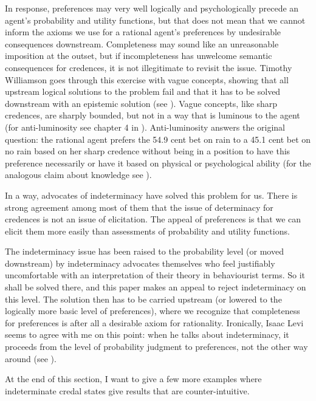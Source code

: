 In response, preferences may very well logically and
psychologically precede an agent's probability and
utility functions, but that does not mean that we
cannot inform the axioms we use for a rational agent's
preferences by undesirable consequences downstream.
Completeness may sound like an unreasonable imposition
at the outset, but if incompleteness has unwelcome
semantic consequences for credences, it is not
illegitimate to revisit the issue. Timothy Williamson
goes through this exercise with vague concepts, showing
that all upstream logical solutions to the problem fail
and that it has to be solved downstream with an
epistemic solution (see ).
Vague concepts, like sharp credences, are sharply
bounded, but not in a way that is luminous to the agent
(for anti-luminosity see chapter 4 in
). Anti-luminosity answers the
original question: the rational agent prefers the 54.9
cent bet on rain to a 45.1 cent bet on no rain based on
her sharp credence without being in a position to have
this preference necessarily or have it based on
physical or psychological ability (for the analogous
claim about knowledge see ).

In a way, advocates of indeterminacy have solved this
problem for us. There is strong agreement among most of
them that the issue of determinacy for credences is not
an issue of elicitation. The appeal of preferences is
that we can elicit them more easily than assessments of
probability and utility functions.

The indeterminacy issue has been raised to the
probability level (or moved downstream) by
indeterminacy advocates themselves who feel justifiably
uncomfortable with an interpretation of their theory in
behaviourist terms. So it shall be solved there, and
this paper makes an appeal to reject indeterminacy on
this level. The solution then has to be carried
upstream (or lowered to the logically more basic level
of preferences), where we recognize that completeness
for preferences is after all a desirable axiom for
rationality. Ironically, Isaac Levi seems to agree with
me on this point: when he talks about indeterminacy, it
proceeds from the level of probability judgment to
preferences, not the other way around (see
).

At the end of this section, I want to give a few more
examples where indeterminate credal states give results
that are counter-intuitive.

